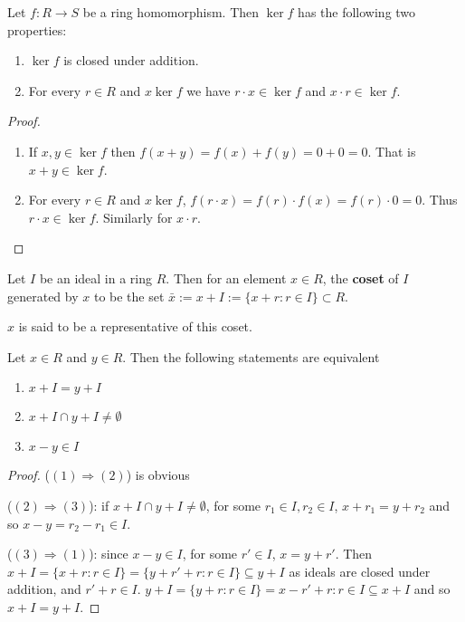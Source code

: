 \begin{lemma}
	Let $f: R \rightarrow S$ be a ring homomorphism. Then $\ker f$ has the following two properties:
	\begin{enumerate}
		\item $\ker f$ is closed under addition.
		\item For every $r \in R$ and $x \ker f$ we have $r \cdot x \in \ker f$ and $x \cdot r \in \ker f$.
	\end{enumerate}
\end{lemma}

\begin{proof}
	\hfill
	\begin{enumerate}
		\item If $x, y \in \ker f$ then $f(x + y) = f(x) + f(y) = 0 + 0 = 0$. That is $x + y \in \ker f$.
		\item For every $r \in R$ and $x \ker f$, $f(r \cdot x) = f(r) \cdot f(x) = f(r) \cdot 0 = 0$. Thus $r \cdot x \in \ker f$. Similarly for $x \cdot r$.
	\end{enumerate}
\end{proof}

\begin{definition}
	Let $I$ be an ideal in a ring $R$. Then for an element $x \in R$, the \textbf{coset} of $I$ generated by $x$ to be the set $\bar{x} := x + I := \{ x + r: r \in I \} \subset R$.

	$x$ is said to be a representative of this coset.
\end{definition}

\begin{lemma}
	Let $x \in R$ and $y \in R$. Then the following statements are equivalent
	\begin{enumerate}
		\item $x + I = y + I$
		\item $x + I \cap y + I \ne \emptyset$
		\item $x - y \in I$
	\end{enumerate}
\end{lemma}

\begin{proof}
	($(1) \Rightarrow (2)$) is obvious

	($(2) \Rightarrow (3)$): if $x + I \cap y + I \ne \emptyset$, for some $r_1 \in I, r_2 \in I$, $x + r_1 = y + r_2$ and so $x - y = r_2 - r_1 \in I$.

	($(3) \Rightarrow (1)$): since $x - y \in I$, for some $r' \in I$, $x = y + r'$. Then $x + I = \{x + r: r \in I\} = \{y + r' + r: r \in I\} \subseteq y + I$ as ideals are closed under addition, and $r' + r \in I$. $y + I = \{y + r: r \in I\} = {x - r' + r: r \in I} \subseteq x + I$ and so $x + I = y + I$.
\end{proof}

